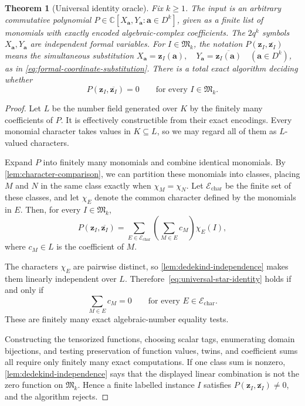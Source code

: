 \documentclass[11pt,letterpaper,onecolumn]{article}
\theoremstyle{plain}
\newtheorem{theorem}{Theorem}[section]
\theoremstyle{definition}
\theoremstyle{remark}
\newcommand{\AlgNums}{\mathbb C}
\newcommand{\zvec}[1]{\mathbf z_{#1}}
\newcommand{\InstMonoid}[1]{\mathfrak M_{#1}}
\begin{document}
\begin{theorem}[Universal identity oracle]
\label{thm:universal-identity}
Fix $k\ge1$.  The input is an arbitrary commutative polynomial $P\in\AlgNums[X_{\mathbf a},Y_{\mathbf a}:\mathbf a\in D^k]$, given as a finite list of monomials with exactly encoded algebraic-complex
coefficients.  The $2q^k$ symbols
$X_{\mathbf a},Y_{\mathbf a}$ are independent formal variables.
For $I\in\InstMonoid{k}$, the notation
$P(\zvec I,\overline{\zvec I})$ means the simultaneous substitution $X_{\mathbf a}=\zvec I(\mathbf a), \quad Y_{\mathbf a}=\overline{\zvec I(\mathbf a)} \quad(\mathbf a\in D^k)$, as in \eqref{eq:formal-coordinate-substitution}.  There is a total exact
algorithm deciding whether
\begin{equation}
  P(\zvec I,\overline{\zvec I})=0
  \qquad\text{for every }I\in\InstMonoid{k}.
  \label{eq:universal-star-identity}
\end{equation}
\end{theorem}

\begin{proof}

Let $L$ be the number field generated over $K$ by the finitely many
coefficients of $P$.  It is effectively constructible from their exact
encodings.  Every monomial character takes values in $K\subseteq L$, so we
may regard all of them as $L$-valued characters.

Expand $P$ into finitely many monomials and combine identical monomials.
By \cref{lem:character-comparison}, we can partition these monomials into
classes, placing $M$ and $N$ in the same class exactly when
$\chi_M=\chi_N$.  Let $\mathcal E_{\mathrm{char}}$ be the finite set of
these classes, and let $\chi_E$ denote the common character defined by the
monomials in $E$.  Then, for every $I\in\InstMonoid{k}$,
\[
  P(\zvec I,\overline{\zvec I})
  =\sum_{E\in\mathcal E_{\mathrm{char}}}
     \left(\sum_{M\in E}c_M\right)\chi_E(I),
\]
where $c_M\in L$ is the coefficient of $M$.

The characters $\chi_E$ are
pairwise distinct, so \cref{lem:dedekind-independence} makes them linearly
independent over $L$.  Therefore~\eqref{eq:universal-star-identity} holds if
and only if
\[
  \sum_{M\in E}c_M=0
  \qquad\text{for every }E\in\mathcal E_{\mathrm{char}}.
\]
These are finitely many exact algebraic-number equality tests.

Constructing the tensorized functions, choosing scalar tags, enumerating
domain bijections, and testing preservation of function values, twins, and
coefficient sums all require only finitely many exact computations.  If
one class sum is nonzero, \cref{lem:dedekind-independence} says that the
displayed linear combination is not the zero function on $\InstMonoid{k}$.
Hence a finite labelled instance $I$ satisfies
$P(\zvec I,\overline{\zvec I})\ne0$, and the algorithm rejects.
\end{proof}
\end{document}
